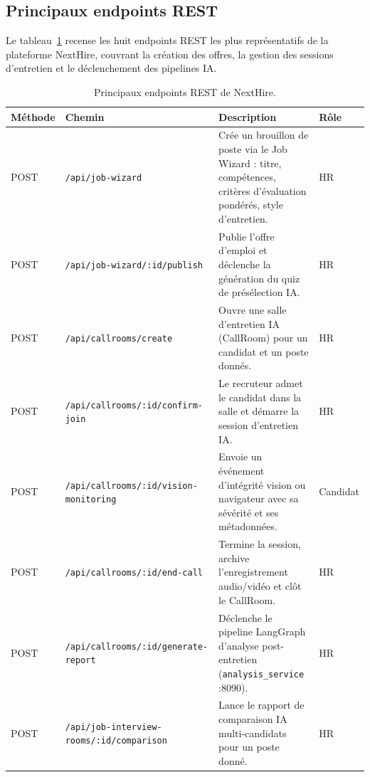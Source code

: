 \subsection{Principaux endpoints REST}

\begin{sloppypar}
Le tableau~\ref{tab:api-endpoints} recense les huit endpoints REST les plus
représentatifs de la plateforme NextHire, couvrant la création des offres, la gestion
des sessions d'entretien et le déclenchement des pipelines IA.
\end{sloppypar}

\begin{table}[H]
\centering
\renewcommand{\arraystretch}{1.45}
\begin{tabular}{|>{\centering\arraybackslash}p{1.3cm}|p{5.8cm}|p{5.8cm}|>{\centering\arraybackslash}p{1.4cm}|}
\hline
\rowcolor{blue!12}
\textbf{Méthode} & \textbf{Chemin} & \textbf{Description} & \textbf{Rôle} \\
\hline
POST &
  \texttt{/api/job-wizard} &
  Crée un brouillon de poste via le Job Wizard : titre, compétences, critères
  d'évaluation pondérés, style d'entretien. &
  HR \\
\hline
POST &
  \texttt{/api/job-wizard/}\newline\texttt{:id/publish} &
  Publie l'offre d'emploi et déclenche la génération du quiz de présélection IA. &
  HR \\
\hline
POST &
  \texttt{/api/callrooms/create} &
  Ouvre une salle d'entretien IA (CallRoom) pour un candidat et un poste donnés. &
  HR \\
\hline
POST &
  \texttt{/api/callrooms/}\newline\texttt{:id/confirm-join} &
  Le recruteur admet le candidat dans la salle et démarre la session d'entretien IA. &
  HR \\
\hline
POST &
  \texttt{/api/callrooms/}\newline\texttt{:id/vision-monitoring} &
  Envoie un événement d'intégrité vision ou navigateur avec sa sévérité et ses
  métadonnées. &
  Candidat \\
\hline
POST &
  \texttt{/api/callrooms/}\newline\texttt{:id/end-call} &
  Termine la session, archive l'enregistrement audio/vidéo et clôt le CallRoom. &
  HR \\
\hline
POST &
  \texttt{/api/callrooms/}\newline\texttt{:id/generate-report} &
  Déclenche le pipeline LangGraph d'analyse post-entretien
  (\texttt{analysis\_service} :8090). &
  HR \\
\hline
POST &
  \texttt{/api/job-interview-rooms/}\newline\texttt{:id/comparison} &
  Lance le rapport de comparaison IA multi-candidats pour un poste donné. &
  HR \\
\hline
\end{tabular}
\caption{Principaux endpoints REST de NextHire.}
\label{tab:api-endpoints}
\end{table}

